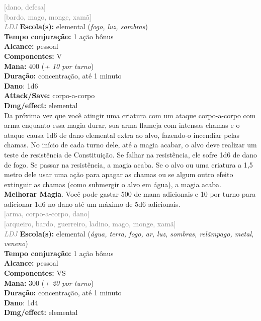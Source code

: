 \documentclass{RPG_Adventure}[2021/10/20]
\begin{document}
{\scriptsize \textcolor{gray}{[dano, defesa]\\}}
{\scriptsize \textcolor{gray}{[bardo, mago, monge, xamã]\\}}
{\tiny \textcolor{gray}{\textit{LDJ}}}\jump{}
{\small \t \textbf{Escola(s):} elemental (\textit{fogo, luz, sombras})\\\t \textbf{Tempo conjuração:} 1 ação bônus\\\t \textbf{Alcance:} pessoal\\\t \textbf{Componentes:} V\\\t \textbf{Mana:} 400 (\textit{+ 10 por turno})\\\t \textbf{Duração:} concentração, até 1 minuto\\\t \textbf{Dano}: 1d6\\\t \textbf{Attack/Save:} corpo-a-corpo\\\t \textbf{Dmg/effect:} elemental\\}
{\normalsize Da próxima vez que você atingir uma criatura com um ataque corpo-a-corpo com arma enquanto essa magia durar, sua arma flameja com intensas chamas e o ataque causa 1d6 de dano elemental extra ao alvo, fazendo-o incendiar pelas chamas. No início de cada turno dele, até a magia acabar, o alvo deve realizar um teste de resistência de Constituição. Se falhar na resistência, ele sofre 1d6 de dano de fogo. Se passar na resistência, a magia acaba. Se o alvo ou uma criatura a 1,5 metro dele usar uma ação para apagar as chamas ou se algum outro efeito extinguir as chamas (como submergir o alvo em água), a magia acaba.\\\t \textbf{Melhorar Magia}. Você pode gastar 500 de mana adicionais e 10 por turno para adicionar 1d6 no dano até um máximo de 5d6 adicionais.\\}
{\scriptsize \textcolor{gray}{[arma, corpo-a-corpo, dano]\\}}
{\scriptsize \textcolor{gray}{[arqueiro, bardo, guerreiro, ladino, mago, monge, xamã]\\}}
{\tiny \textcolor{gray}{\textit{LDJ}}}\jump{}
{\small \t \textbf{Escola(s):} elemental (\textit{água, terra, fogo, ar, luz, sombras, relâmpago, metal, veneno})\\\t \textbf{Tempo conjuração:} 1 ação bônus\\\t \textbf{Alcance:} pessoal\\\t \textbf{Componentes:} VS\\\t \textbf{Mana:} 300 (\textit{+ 20 por turno})\\\t \textbf{Duração:} concentração, até 1 minuto\\\t \textbf{Dano}: 1d4\\\t \textbf{Dmg/effect:} elemental\\}
\end{document}
